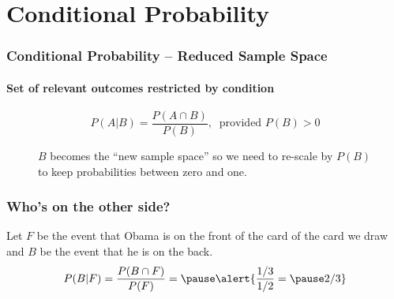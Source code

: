 \documentclass{beamer}
\begin{document}
\section{Conditional Probability}
\begin{frame}
\frametitle{Conditional Probability -- Reduced Sample Space}
\framesubtitle{Set of relevant outcomes restricted by condition}
$$P(A|B) = \frac{P(A\cap B)}{P(B)},\;\; \mbox{provided } P(B)>0$$
\begin{figure}
\centering
{}
\caption{$B$ becomes the ``new sample space'' so we need to re-scale by $P(B)$ to keep probabilities between zero and one.}
\end{figure}
\end{frame}
\begin{frame}
\frametitle{Who's on the other side?}
Let $F$ be the event that Obama is on the front of the card of the card we draw and $B$ be the event that he is on the back.
$$P(B|F) = \frac{P(B\cap F)}{P(F)} = \pause \alert{\frac{1/3}{1/2}= \pause 2/3}$$

\end{frame}
\end{document}
